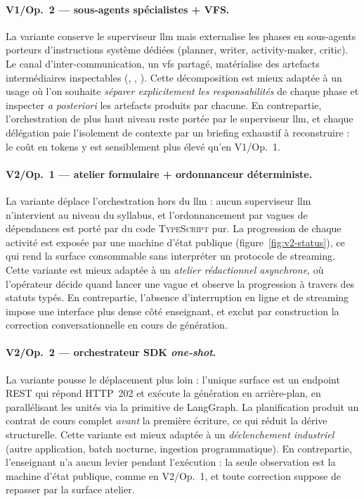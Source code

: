 \paragraph{V1/Op.~2 — sous-agents spécialistes + VFS.}
La variante  conserve le superviseur \gls{llm}
mais externalise les phases en sous-agents porteurs d'instructions
système dédiées (planner, writer, activity-maker, critic). Le canal
d'inter-communication, un \gls{vfs} partagé, matérialise des
artefacts intermédiaires inspectables (,
, ). Cette
décomposition est mieux adaptée à un usage où l'on souhaite
\emph{séparer explicitement les responsabilités} de chaque phase
et inspecter \emph{a posteriori} les artefacts produits par chacune.
En contrepartie, l'orchestration de plus haut niveau reste portée
par le superviseur \gls{llm}, et chaque délégation paie l'isolement
de contexte par un briefing exhaustif à reconstruire : le coût en
tokens y est sensiblement plus élevé qu'en V1/Op.~1.

\paragraph{V2/Op.~1 — atelier formulaire + ordonnanceur déterministe.}
La variante  déplace l'orchestration
hors du \gls{llm} : aucun superviseur \gls{llm} n'intervient au
niveau du syllabus, et l'ordonnancement par vagues de dépendances est
porté par du code \textsc{TypeScript} pur. La progression de chaque
activité est exposée par une machine d'état publique
(figure~\ref{fig:v2-status}), ce qui rend la surface consommable
sans interpréter un protocole de streaming. Cette variante est mieux
adaptée à un \emph{atelier rédactionnel asynchrone}, où l'opérateur
décide quand lancer une vague et observe la progression à travers
des statuts typés. En contrepartie, l'absence d'interruption en
ligne et de streaming impose une interface plus dense côté
enseignant, et exclut par construction la correction conversationnelle
en cours de génération.

\paragraph{V2/Op.~2 — orchestrateur SDK \emph{one-shot}.}
La variante  pousse le déplacement plus
loin : l'unique surface est un endpoint REST qui répond
\textsc{HTTP}~202 et exécute la génération en arrière-plan, en
parallélisant les unités via la primitive  de
LangGraph. La planification produit un contrat de cours complet
\emph{avant} la première écriture, ce qui réduit la dérive
structurelle. Cette variante est mieux adaptée à un
\emph{déclenchement industriel} (autre application, batch nocturne,
ingestion programmatique). En contrepartie, l'enseignant n'a aucun
levier pendant l'exécution : la seule observation est la machine
d'état publique, comme en V2/Op.~1, et toute correction suppose de
repasser par la surface atelier.

